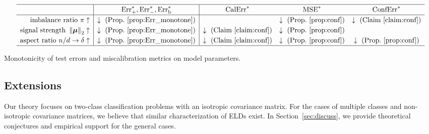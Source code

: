 \begin{table}[h!]
\begin{equation*}
\renewcommand{\arraystretch}{1.2}
    \begin{array}{r|c|ccc}
    \hline
           & \mathrm{Err}_{+}^*, \mathrm{Err}_{-}^*, \mathrm{Err}_{\mathrm{b}}^* & \mathrm{CalErr}^*  & \mathrm{MSE}^*  &  \mathrm{ConfErr}^* \\
    \hline
      \text{imbalance ratio}~\pi \uparrow
          &  \downarrow ~ \text{(Prop.~\ref{prop:Err_monotone})}    
          &  
          &  \downarrow ~ \text{(Prop.~\ref{prop:conf})}    
          &  \downarrow ~ \text{(Claim~\ref{claim:conf})}   \\
      \text{signal strength}~\norm{\bmu}_2 \uparrow
          &  \downarrow ~ \text{(Prop.~\ref{prop:Err_monotone})}    
          &  \downarrow ~ \text{(Claim~\ref{claim:conf})}
          &  \downarrow  ~ \text{(Prop.~\ref{prop:conf})}   
          &       \\
      \text{aspect ratio}~n/d \to \delta \uparrow
          &  \downarrow ~ \text{(Prop.~\ref{prop:Err_monotone})}    
          &  \downarrow ~ \text{(Claim~\ref{claim:conf})}
          &  \downarrow ~ \text{(Prop.~\ref{prop:conf})}    
          &  \downarrow  ~ \text{(Prop.~\ref{prop:conf})}  \\
    \hline
    \end{array}
\end{equation*}
\vspace{-5mm}
\caption{Monotonicity of test errors and miscalibration metrics on model parameters. }
\label{tab:monotone}
\end{table}

\subsection{Extensions}

Our theory focuses on two-class classification problems with an isotropic covariance matrix. For the cases of multiple classes and non-isotropic covariance matrices, we believe that similar characterization of ELDs exist. In Section~\ref{sec:discuss}, we provide theoretical conjectures and empirical support for the general cases.

